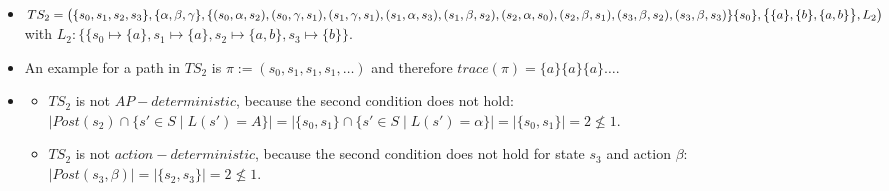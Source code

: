 \documentclass[a4paper,11pt]{scrartcl}
\begin{document}
\begin{itemize}
\begin{itemize}
			\item[(ii)] $TS_1$ is also $action-deterministic$, because both conditions hold:
			\begin{itemize}
				\item $\mid I \mid = \mid \{s_0\} \leq 1$
				\item $|Post(s_0, \alpha)| = |Post(s_0, \gamma)| = |Post(s_1, \alpha)| = |Post(s_1, \beta)|= |Post(s_1, \gamma)|= |Post(s_2, \alpha)| = |Post(s_2, \beta)| = |Post(s_4, \alpha)|= |Post(s_4, \gamma)| = 1$ and for every other pair $(s_i, \sigma)$ with $s_i \in \{s_0, s_1, s_2, s_3, s_4\}$ and $\sigma \in \{\alpha, \beta, \gamma\}$ holds $(s_i, \sigma)=0$.
			\end{itemize}
		\end{itemize}
		\item[d)] $ TS_2 = \bigl( \{s_0, s_1, s_2, s_3\}, \{\alpha,\beta, \gamma\}, \\
		\{ (s_0, \alpha, s_2), (s_0, \gamma, s_1), (s_1, \gamma, s_1), (s_1, \alpha, s_3), (s_1, \beta, s_2), (s_2, \alpha, s_0), (s_2, \beta, s_1), (s_3, \beta, s_2), (s_3, \beta, s_3) \}\\
		\{s_0\}, \bigl\{ \{a\}, \{b\}, \{a,b\} \bigr\}, L_2 \bigr)$\\
		with $L_2: \bigl\{ \{s_0 \mapsto \{a\}, s_1 \mapsto \{a\}, s_2 \mapsto \{a,b\}, s_3 \mapsto \{b\}\bigr\}$.
		\item[e)] An example for a path in $TS_2$ is $\pi := (s_0, s_1, s_1, s_1, \dots)$ and therefore $trace(\pi)=\{a\}\{a\}\{a\}\dots$.
		\item[f)]
		\begin{itemize}
			\item[(i)] $TS_2$ is not $AP-deterministic$, because the second condition does not hold: $| Post(s_2) \cap \{s' \in S \mid L(s')=A\} |= |\{s_0, s_1\} \cap \{s' \in S \mid L(s')=\alpha\}|= |\{s_0, s_1\}| = 2 \nleq 1$.
			\item[(ii)] $TS_2$ is not $action-deterministic$, because the second condition does not hold for state $s_3$ and action $\beta$: $|Post(s_3, \beta)| = |\{ s_2, s_3\}| = 2 \nleq 1$.
		\end{itemize}
	\end{itemize}
	
\end{document}
